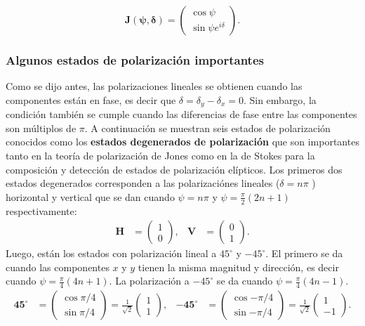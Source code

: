 \begin{equation}
\mathbf{J(\psi,\delta)} =\begin{pmatrix} \cos{\psi}\\\sin{\psi}e^{i\delta}\end{pmatrix}.
\label{eq:normalized_jones_vector}
\end{equation}

\subsubsection{Algunos estados de polarización importantes}
Como se dijo antes, las polarizaciones lineales se obtienen cuando las
componentes están en fase, es decir que $\delta =
\delta_y-\delta_x=0$. Sin embargo, la condición también se cumple cuando las
diferencias de fase entre las componentes son múltiplos de $\pi$. 
A continuación se muestran seis estados de polarización conocidos
como los \textbf{estados degenerados de polarización}
 que son importantes tanto en la teoría de
polarización de Jones como en la de Stokes para la composición y
detección de estados de polarización elípticos.
Los primeros dos estados degenerados corresponden a las polarizaciónes
lineales ($\delta = n\pi$ ) horizontal y vertical que se dan cuando $\psi
= n\pi$ y $\psi = \frac{\pi}{2}(2n+1)$ respectivamente:
\begin{align*}
\mathbf{H} &=\begin{pmatrix}1\\0\end{pmatrix},& \mathbf{V} &=\begin{pmatrix}0\\1\end{pmatrix}.
\end{align*}
Luego, están los estados con polarización lineal a $45^{\circ}$ y
$-45^{\circ}$. El primero se da cuando las componentes $x$
y $y$ tienen la misma magnitud y dirección, es decir cuando
$\psi=\frac{\pi}{4}(4n+1)$. La polarización a  $-45^{\circ}$ se da cuando
$\psi=\frac{\pi}{4}(4n-1)$.
\begin{align*}
\mathbf{45^{\circ}}
&=\begin{pmatrix}\cos{\pi/4}\\\sin{\pi/4}\end{pmatrix}=\frac{1}{\sqrt{2}}
\begin{pmatrix}1\\1\end{pmatrix},&
\mathbf{-45^{\circ}} 
&=\begin{pmatrix}\cos{-\pi/4}\\\sin{-\pi/4}\end{pmatrix}=\frac{1}{\sqrt{2}}\begin{pmatrix}1\\-1\end{pmatrix}. 
\end{align*} 
